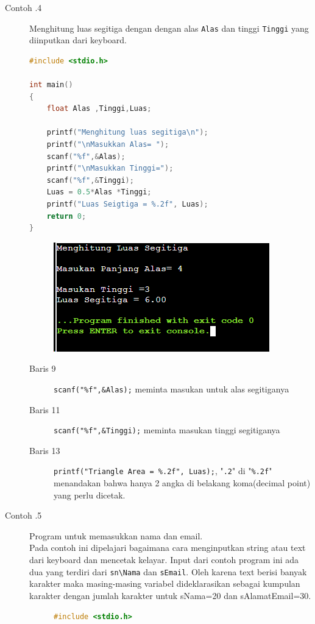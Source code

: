 \begin{description}
	\item  [Contoh \thesubsection.4] Menghitung luas segitiga dengan  dengan alas \verb*|Alas|   dan tinggi \verb*|Tinggi| yang diinputkan dari keyboard.
	      \begin{lstlisting}[language=c]
#include <stdio.h>

int main()
{
	float Alas ,Tinggi,Luas;
	
	printf("Menghitung luas segitiga\n");
	printf("\nMasukkan Alas= ");
	scanf("%f",&Alas);
	printf("\nMasukkan Tinggi=");
	scanf("%f",&Tinggi);
	Luas = 0.5*Alas *Tinggi;
	printf("Luas Seigtiga = %.2f", Luas);
	return 0;
}
	\end{lstlisting}
	      \begin{figure}[H]
		      \centering
		      \includegraphics[width=0.5\linewidth]{P1/img/screenshot0005.png}
		      \caption{}
		      \label{fig:screenshot0005}
	      \end{figure}

	      \begin{description}
		      \item [Baris 9]\verb|scanf("%f",&Alas);| meminta masukan untuk alas segitiganya
		      \item [Baris 11]\verb|scanf("%f",&Tinggi);| meminta masukan tinggi segitiganya
		      \item [Baris 13]\verb|printf("Triangle Area = %.2f", Luas);|,  "\verb|.2|" di "\verb|%.2f|" menandakan bahwa hanya 2 angka di belakang koma(decimal point) yang perlu dicetak.
	      \end{description}

	\item[Contoh \thesubsection.5] Program untuk memasukkan nama dan email.\\
		Pada contoh ini dipelajari bagaimana cara menginputkan string atau text dari keyboard dan mencetak kelayar. Input dari contoh program ini ada dua yang terdiri dari \verb|sn\Nama| dan \verb|sEmail|. Oleh karena text berisi banyak karakter maka masing-masing variabel dideklarasikan sebagai kumpulan karakter dengan jumlah karakter untuk sNama=20 dan sAlamatEmail=30.
		\begin{figure}[H]
			\begin{lstlisting}[language=c]
				#include <stdio.h>
				

\end{lstlisting}
\end{figure}
\end{description}
